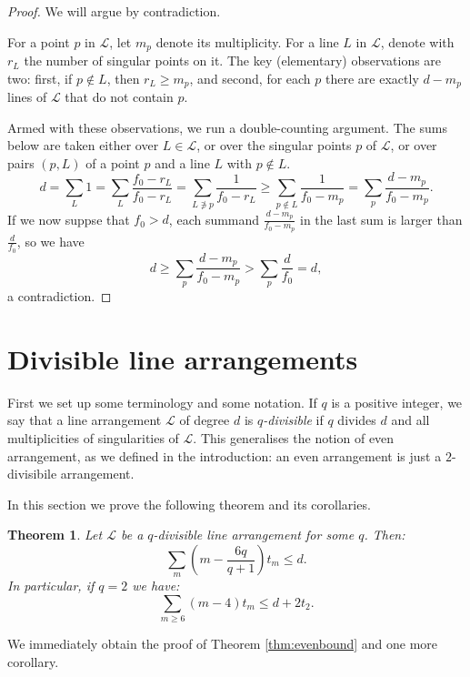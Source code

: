 \documentclass[a4paper,12pt, onesided]{amsart}
\newtheorem{thm}{Theorem}[section]
\newtheorem{cor}[thm]{Corollary}
\theoremstyle{remark}
\numberwithin{figure}{section}
\numberwithin{equation}{section}
\renewcommand{\L}{\mathcal{L}}
\newcommand{\MG}[1]{\marginpar{\tiny\color{red}{\bf MG}: {#1}}}
\begin{document}
\begin{proof}
We will argue by contradiction.

For a point $p$ in $\L$, let $m_p$ denote its multiplicity.
For a line $L$ in $\L$, denote with $r_L$ the number of singular points on it.
The key (elementary) observations are two: first, if $p \not\in L$, then $r_L \ge m_p$, and second, for each $p$ there are exactly $d-m_p$ lines of $\L$ that do not contain $p$.

Armed with these observations, we run a double-counting argument.
The sums below are taken either over $L\in\L$, or over the singular points $p$ of $\L$, or over pairs $(p,L)$ of a point $p$ and a line $L$ with $p \not\in L$.
\[
d = \sum_L 1 = \sum_L \frac{f_0-r_L}{f_0-r_L} = \sum_{L \not \ni p} \frac1{f_0-r_L} \ge \sum_{p \not\in L} \frac1{f_0-m_p} = \sum_p \frac{d-m_p}{f_0-m_p}.
\]
If we now suppse that $f_0 > d$, each summand $\frac{d-m_p}{f_0-m_p}$ in the last sum is larger than $\frac{d}{f_0}$, so we have
\[
d \ge \sum_p \frac{d-m_p}{f_0-m_p} > \sum_p \frac{d}{f_0} = d,
\]
a contradiction.
\end{proof}

\section{Divisible line arrangements}\label{s:even}

First we set up some terminology and some notation.
If $q$ is a positive integer, we say that a line arrangement $\L$ of degree $d$ is \emph{$q$-divisible} if $q$ divides $d$ and all multiplicities of singularities of $\L$.
This generalises the notion of even arrangement, as we defined in the introduction: an even arrangement is just a $2$-divisibile arrangement.

In this section we prove the following theorem and its corollaries.

\begin{thm}\label{t:divisible}
Let $\L$ be a $q$-divisible line arrangement for some $q$. Then:
\[
\sum_m (m-{\textstyle \frac{6q}{q+1}})t_m \le d.
\]
In particular, if $q=2$ we have:
\[
\sum_{m \ge 6} (m-4)t_m \le d + 2t_2.
\]
\end{thm}

We immediately obtain the proof of Theorem \ref{thm:evenbound} and one more corollary.
\end{document}
